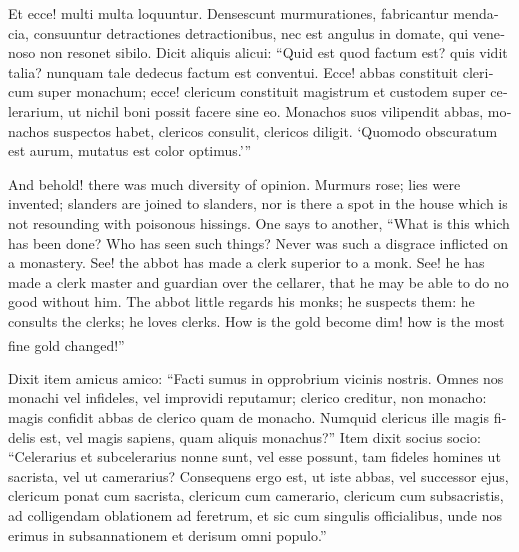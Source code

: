 \documentclass{book}
\newcounter{engnote}
\newcommand{\engnotenum}{\textsuperscript{\arabic{engnote}\stepcounter{engnote}}}
\newcommand{\engnotetext}[1]{\vphantom{\footnotemark{}}\footnotetext{#1}}
\begin{document}
\begin{paracol}{2}
\begin{otherlanguage}{latin}
Et ecce! multi multa loquuntur. Densescunt murmurationes, fabricantur mendacia, consuuntur detractiones detractionibus, nec est angulus in domate, qui venenoso non resonet sibilo. Dicit aliquis alicui: ``Quid est quod factum est? quis vidit talia? nunquam tale dedecus factum est conventui. Ecce! abbas constituit clericum super monachum; ecce! clericum constituit magistrum et custodem super celerarium, ut nichil boni possit facere sine eo. Monachos suos vilipendit abbas, monachos suspectos habet, clericos consulit, clericos diligit. `Quomodo obscuratum est aurum, mutatus est color optimus.'\hspace{1pt}''\engnotetext{Lament.\ iv., \oldstylenums{1}.}
\end{otherlanguage}

\switchcolumn

And behold! there was much diversity of opinion. Murmurs rose; lies were invented; slanders are joined to slanders, nor is there a spot in the house which is not resounding with poisonous hissings. One says to another, ``What is this which has been done? Who has seen such things? Never was such a disgrace inflicted on a monastery. See! the abbot has made a clerk superior to a monk. See! he has made a clerk master and guardian over the cellarer, that he may be able to do no good without him. The abbot little regards his monks; he suspects them: he consults the clerks; he loves clerks. How is the gold become dim! how is the most fine gold changed!''\engnotenum{}

\switchcolumn*

\begin{otherlanguage}{latin}
Dixit item amicus amico: ``Facti sumus in opprobrium vicinis nostris. Omnes nos monachi vel infideles, vel improvidi reputamur; clerico creditur, non monacho: magis confidit abbas de clerico quam de monacho. Numquid clericus ille magis fidelis est, vel magis sapiens, quam aliquis monachus?'' Item dixit socius socio: ``Celerarius et subcelerarius nonne sunt, vel esse possunt, tam fideles homines ut sacrista, vel ut camerarius? Consequens ergo est, ut iste abbas, vel successor ejus, clericum ponat cum sacrista, clericum cum camerario, clericum cum subsacristis, ad colligendam oblationem ad feretrum, et sic cum singulis officialibus, unde nos erimus in subsannationem et derisum omni populo.''
\end{otherlanguage}

\switchcolumn


\end{paracol}
\end{document}
